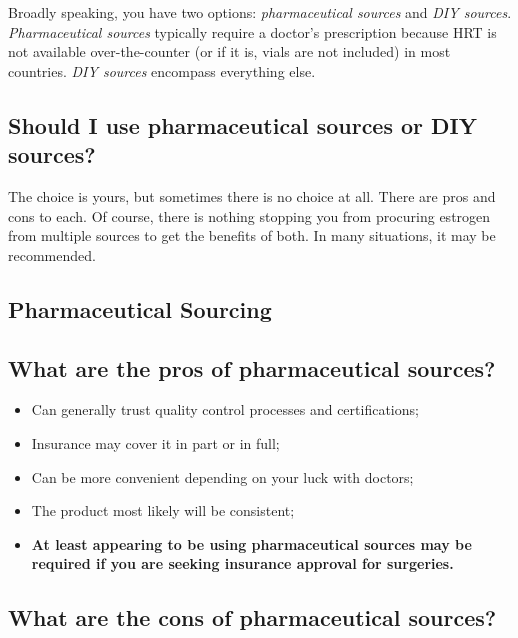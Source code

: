 \documentclass{article}
\begin{document}
Broadly speaking, you have two options: \textit{pharmaceutical sources} and \textit{DIY sources}. \textit{Pharmaceutical sources} typically require a doctor's prescription because HRT is not available over-the-counter (or if it is, vials are not included) in most countries. \textit{DIY sources} encompass everything else.

\subsection{Should I use pharmaceutical sources or DIY sources?}

The choice is yours, but sometimes there is no choice at all. There are pros and cons to each. Of course, there is nothing stopping you from procuring estrogen from multiple sources to get the benefits of both. In many situations, it may be recommended.

\subsection*{Pharmaceutical Sourcing}

\subsection{What are the pros of pharmaceutical sources?}

\begin{itemize}
  \item Can generally trust quality control processes and certifications;
  \item Insurance may cover it in part or in full;
  \item Can be more convenient depending on your luck with doctors;
  \item The product most likely will be consistent;
  \item \textbf{At least appearing to be using pharmaceutical sources may be required if you are seeking insurance approval for surgeries.}
\end{itemize}

\subsection{What are the cons of pharmaceutical sources?}
\end{document}

